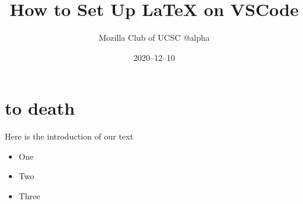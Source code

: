 \documentclass[12pt]{article}
\title{How to Set Up LaTeX on VSCode}
\author{Mozilla Club of UCSC @alpha}
\date{2020–12–10}
\begin{document}
\maketitle

\section{ to death}

Here is the introduction of our text

\begin{itemize}

\item One

\item Two

\item Three

\end{itemize}
\end{document}
